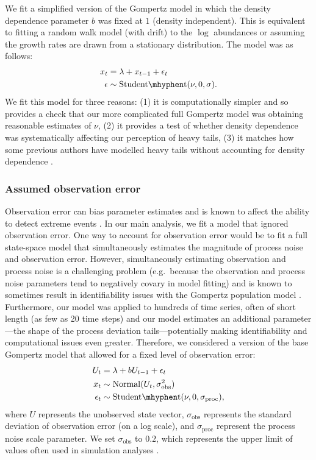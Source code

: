 We fit a simplified version of the Gompertz model in which the density
dependence parameter $b$ was fixed at $1$ (density independent). This is
equivalent to fitting a random walk model (with drift) to the $\log$
abundances or assuming the growth rates are drawn from a stationary
distribution. The model was as follows:
\begin{align*}
x_t &= \lambda + x_{t-1} + \epsilon_t\\
\epsilon &\sim \mathrm{Student\mhyphen t}(\nu, 0, \sigma).
\end{align*}
We fit this model for three reasons: (1) it is computationally simpler and so
provides a check that our more complicated full Gompertz model was obtaining
reasonable estimates of $\nu$, (2) it provides a test of whether density
dependence was systematically affecting our perception of heavy tails, (3) it
matches how some previous authors have modelled heavy tails without accounting
for density dependence \citep{segura2013}.

\subsubsection{Assumed observation error}

Observation error can bias parameter estimates \citep[e.g.][]{knape2012} and
is known to affect the ability to detect extreme events \citep{ward2007}. In
our main analysis, we fit a model that ignored observation error. One way to
account for observation error would be to fit a full state-space model that
simultaneously estimates the magnitude of process noise and observation error.
However, simultaneously estimating observation and process noise is a
challenging problem (e.g.\ because the observation and process noise
parameters tend to negatively covary in model fitting) and is known to
sometimes result in identifiability issues with the Gompertz population model
\citep{knape2008}. Furthermore, our model was applied to hundreds of time
series, often of short length (as few as 20 time steps) and our model
estimates an additional parameter---the shape of the process deviation
tails---potentially making identifiability and computational issues even
greater. Therefore, we considered a version of the base Gompertz model that
allowed for a fixed level of observation error:
\begin{align*}
U_t &= \lambda + b U_{t-1} + \epsilon_t\\
x_t &\sim \mathrm{Normal}(U_t, \sigma_\mathrm{obs}^2)\\
\epsilon_t &\sim \mathrm{Student\mhyphen t}(\nu, 0, \sigma_\mathrm{proc}),
\end{align*}
where $U$ represents the unobserved state vector, $\sigma_\mathrm{obs}$
represents the standard deviation of observation error (on a log scale), and
$\sigma_\mathrm{proc}$ represent the process noise scale parameter. We set
$\sigma_\mathrm{obs}$ to $0.2$, which represents the upper limit of values
often used in simulation analyses \citep[e.g.][]{valpine2002, thorson2014b}.

